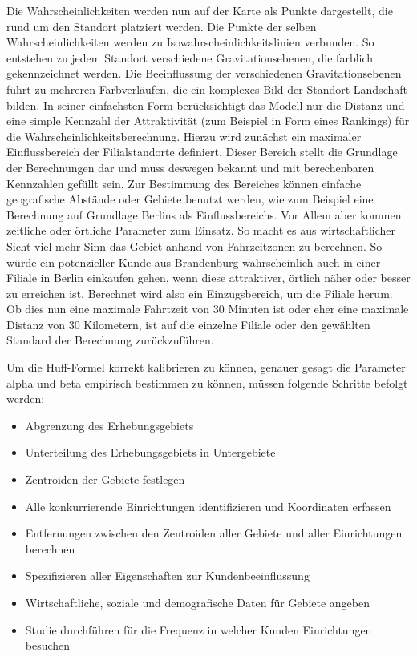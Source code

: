 Die Wahrscheinlichkeiten werden nun auf der Karte als Punkte dargestellt, die rund um den Standort platziert werden. 
Die Punkte der selben Wahrscheinlichkeiten werden zu Isowahrscheinlichkeitslinien verbunden. 
So entstehen zu jedem Standort verschiedene Gravitationsebenen, die farblich gekennzeichnet werden. 
Die Beeinflussung der verschiedenen Gravitationsebenen führt zu mehreren Farbverläufen, die ein komplexes Bild der Standort Landschaft bilden.
In seiner einfachsten Form berücksichtigt das Modell nur die Distanz und eine simple Kennzahl der Attraktivität (zum Beispiel in Form eines Rankings) für die Wahrscheinlichkeitsberechnung. 
Hierzu wird zunächst ein maximaler Einflussbereich der Filialstandorte definiert. 
Dieser Bereich stellt die Grundlage der Berechnungen dar und muss deswegen bekannt und mit berechenbaren Kennzahlen gefüllt sein.
Zur Bestimmung des Bereiches können einfache geografische Abstände oder Gebiete benutzt werden, wie zum Beispiel eine Berechnung auf Grundlage Berlins als Einflussbereichs.
Vor Allem aber kommen zeitliche oder örtliche Parameter zum Einsatz.
So macht es aus wirtschaftlicher Sicht viel mehr Sinn das Gebiet anhand von Fahrzeitzonen zu berechnen.
So würde ein potenzieller Kunde aus Brandenburg wahrscheinlich auch in einer Filiale in Berlin einkaufen gehen, wenn diese attraktiver, örtlich näher oder besser zu erreichen ist.
Berechnet wird also ein Einzugsbereich, um die Filiale herum.
Ob dies nun eine maximale Fahrtzeit von 30 Minuten ist oder eher eine maximale Distanz von 30 Kilometern, ist auf die einzelne Filiale oder den gewählten Standard der Berechnung zurückzuführen.

Um die Huff-Formel korrekt kalibrieren zu können, genauer gesagt die Parameter alpha und beta empirisch bestimmen zu können, müssen folgende Schritte befolgt werden:

\begin{itemize}
	\item Abgrenzung des Erhebungsgebiets
	\item Unterteilung des Erhebungsgebiets in Untergebiete
	\item Zentroiden der Gebiete festlegen
	\item Alle konkurrierende Einrichtungen identifizieren und Koordinaten erfassen
	\item Entfernungen zwischen den Zentroiden aller Gebiete und aller Einrichtungen berechnen
	\item Spezifizieren aller Eigenschaften zur Kundenbeeinflussung
	\item Wirtschaftliche, soziale und demografische Daten für Gebiete angeben
	\item Studie durchführen für die Frequenz in welcher Kunden Einrichtungen besuchen
\end{itemize}

